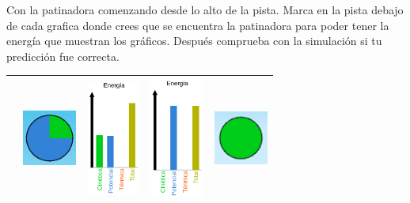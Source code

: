 Con la patinadora comenzando desde lo alto de la pista.  Marca en la pista debajo de cada grafica donde crees que se encuentra la patinadora para poder tener la energía que muestran los gráficos. Después comprueba con la simulación si tu predicción fue correcta.

\begin{table}[H]
    \centering
    \begin{tabular}{|p{1.8cm}|c|c|c|c|}
        \hline
                                            & \includegraphics[width=50pt]{../images/pie}    & \includegraphics[width=50pt]{../images/bars}   & \includegraphics[width=50pt]{../images/bars_potential} & \includegraphics[width=50pt]{../images/pie_green} \\ \hline

\end{tabular}
\end{table}
